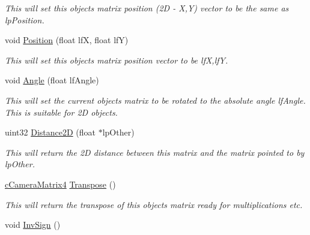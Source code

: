 \begin{DoxyCompactItemize}
\begin{DoxyCompactList}\small\item\em This will set this objects matrix position (2D -\/ X,Y) vector to be the same as lpPosition. \end{DoxyCompactList}\item 
\hypertarget{classc_camera_matrix4_a293ac7d2919eae7205b568ea56fa104c}{
void \hyperlink{classc_camera_matrix4_a293ac7d2919eae7205b568ea56fa104c}{Position} (float lfX, float lfY)}
\label{classc_camera_matrix4_a293ac7d2919eae7205b568ea56fa104c}

\begin{DoxyCompactList}\small\item\em This will set this objects matrix position vector to be lfX,lfY. \end{DoxyCompactList}\item 
\hypertarget{classc_camera_matrix4_a6be0f1f82cc4ee5a5953cb3b569b4285}{
void \hyperlink{classc_camera_matrix4_a6be0f1f82cc4ee5a5953cb3b569b4285}{Angle} (float lfAngle)}
\label{classc_camera_matrix4_a6be0f1f82cc4ee5a5953cb3b569b4285}

\begin{DoxyCompactList}\small\item\em This will set the current objects matrix to be rotated to the absolute angle lfAngle. This is suitable for 2D objects. \end{DoxyCompactList}\item 
\hypertarget{classc_camera_matrix4_a02c68197ed3c64c95985269f5b9f66a4}{
uint32 \hyperlink{classc_camera_matrix4_a02c68197ed3c64c95985269f5b9f66a4}{Distance2D} (float $\ast$lpOther)}
\label{classc_camera_matrix4_a02c68197ed3c64c95985269f5b9f66a4}

\begin{DoxyCompactList}\small\item\em This will return the 2D distance between this matrix and the matrix pointed to by lpOther. \end{DoxyCompactList}\item 
\hypertarget{classc_camera_matrix4_ac1fa4dd9add669a8faecd0ca79713278}{
\hyperlink{classc_camera_matrix4}{cCameraMatrix4} \hyperlink{classc_camera_matrix4_ac1fa4dd9add669a8faecd0ca79713278}{Transpose} ()}
\label{classc_camera_matrix4_ac1fa4dd9add669a8faecd0ca79713278}

\begin{DoxyCompactList}\small\item\em This will return the transpose of this objects matrix ready for multiplications etc. \end{DoxyCompactList}\item 
\hypertarget{classc_camera_matrix4_a97d111c444dd87ecec278e585fe058a7}{
void \hyperlink{classc_camera_matrix4_a97d111c444dd87ecec278e585fe058a7}{InvSign} ()}
\label{classc_camera_matrix4_a97d111c444dd87ecec278e585fe058a7}


\end{DoxyCompactItemize}
